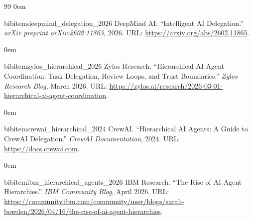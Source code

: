 \begin{thebibliography}{99}
\itemsep0em

bibitem{deepmind_delegation_2026}
DeepMind AI.
``Intelligent AI Delegation.''%
\textit{arXiv preprint arXiv:2602.11865}, 2026.
URL: \url{https://arxiv.org/abs/2602.11865}.

\itemsep0em

bibitem{zylos_hierarchical_2026}
Zylos Research.
``Hierarchical AI Agent Coordination: Task Delegation, Review Loops, and Trust Boundaries.''%
\textit{Zylos Research Blog}, March 2026.
URL: \url{https://zylos.ai/research/2026-03-01-hierarchical-ai-agent-coordination}.

\itemsep0em

bibitem{crewai_hierarchical_2024}
CrewAI.
``Hierarchical AI Agents: A Guide to CrewAI Delegation.''%
\textit{CrewAI Documentation}, 2024.
URL: \url{https://docs.crewai.com}.

\itemsep0em

bibitem{ibm_hierarchical_agents_2026}
IBM Research.
``The Rise of AI Agent Hierarchies.''%
\textit{IBM Community Blog}, April 2026.
URL: \url{https://community.ibm.com/community/user/blogs/sarah-bowden/2026/04/16/the-rise-of-ai-agent-hierarchies}.

\end{thebibliography}